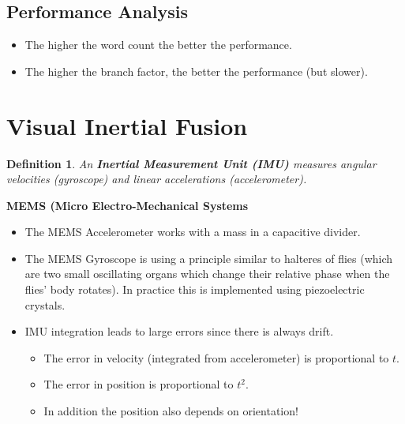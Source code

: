 \documentclass[10pt,a4paper]{scrartcl}
\newtheorem{define}{Definition}
\begin{document}
\begin{multicols*}{2}
\subsection{Performance Analysis}


\begin{itemize}
\item The higher the word count the better the performance.
\item The higher the branch factor, the better the performance (but slower).
\end{itemize}

\section{Visual Inertial Fusion}

\begin{define}
An \textbf{Inertial Measurement Unit (IMU)} measures angular velocities (gyroscope) and linear accelerations (accelerometer).
\end{define}

\textbf{MEMS (Micro Electro-Mechanical Systems}


\begin{itemize}
\item The MEMS Accelerometer works with a mass in a capacitive divider.
\item The MEMS Gyroscope is using a principle similar to halteres of flies (which are two small oscillating organs which change their relative phase when the flies' body rotates). In practice this is implemented using piezoelectric crystals.
\item IMU integration leads to large errors since there is always drift.
\begin{itemize}
\item The error in velocity (integrated from accelerometer) is proportional to $t$.
\item The error in position is proportional to $t^2$.
\item In addition the position also depends on orientation!
\end{itemize}
\end{itemize}


\end{multicols*}
\end{document}
